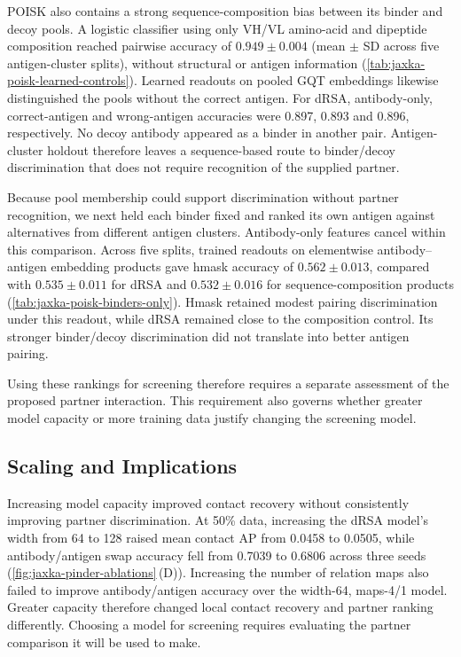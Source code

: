 POISK also contains a strong sequence-composition bias between its binder and decoy pools. A logistic classifier using only VH/VL amino-acid and dipeptide composition reached pairwise accuracy of $0.949 \pm 0.004$ (mean $\pm$ SD across five antigen-cluster splits), without structural or antigen information (\cref{tab:jaxka-poisk-learned-controls}). Learned readouts on pooled GQT embeddings likewise distinguished the pools without the correct antigen. For dRSA, antibody-only, correct-antigen and wrong-antigen accuracies were 0.897, 0.893 and 0.896, respectively. No decoy antibody appeared as a binder in another pair. Antigen-cluster holdout therefore leaves a sequence-based route to binder/decoy discrimination that does not require recognition of the supplied partner.

Because pool membership could support discrimination without partner recognition, we next held each binder fixed and ranked its own antigen against alternatives from different antigen clusters. Antibody-only features cancel within this comparison. Across five splits, trained readouts on elementwise antibody--antigen embedding products gave hmask accuracy of $0.562 \pm 0.013$, compared with $0.535 \pm 0.011$ for dRSA and $0.532 \pm 0.016$ for sequence-composition products (\cref{tab:jaxka-poisk-binders-only}). Hmask retained modest pairing discrimination under this readout, while dRSA remained close to the composition control. Its stronger binder/decoy discrimination did not translate into better antigen pairing.

Using these rankings for screening therefore requires a separate assessment of the proposed partner interaction. This requirement also governs whether greater model capacity or more training data justify changing the screening model.

\subsection{Scaling and Implications}
\label{sec:jaxka-scaling-results}

Increasing model capacity improved contact recovery without consistently improving partner discrimination. At 50\% data, increasing the dRSA model's width from 64 to 128 raised mean contact AP from 0.0458 to 0.0505, while antibody/antigen swap accuracy fell from 0.7039 to 0.6806 across three seeds (\cref{fig:jaxka-pinder-ablations}\,(D)). Increasing the number of relation maps also failed to improve antibody/antigen accuracy over the width-64, maps-4/1 model. Greater capacity therefore changed local contact recovery and partner ranking differently. Choosing a model for screening requires evaluating the partner comparison it will be used to make.

